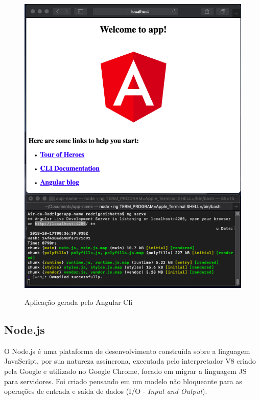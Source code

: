 \documentclass[
	12pt,				%
	openright,			%
	twoside,			%
	a4paper,			%
	english,			%
	brazil				%
	]{abntex2}
\begin{document}
\pagebreak
\begin{figure}[h]
	\centering

	\caption{Aplicação gerada pelo Angular Cli} \label{fig:AngularCliApp}
    \includegraphics[scale=0.4]{angular-cli-app} \\

\end{figure}

\subsection{Node.js}

O Node.js é uma plataforma de desenvolvimento construída sobre a linguagem JavaScript, por sua natureza assíncrona, executada pelo interpretador V8 criado pela Google e utilizado no Google Chrome, focado em migrar a linguagem JS para servidores. Foi criado pensando em um modelo não bloqueante para as operações de entrada e saída de dados (I/O - \textit{Input and Output}).
\end{document}

